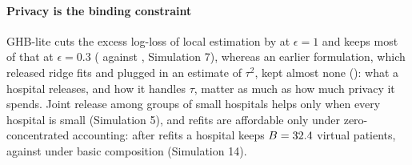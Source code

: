 \begin{table}[t]
\caption{Simulation 15: who pays. Left: the largest ratio of any hospital's mean excess log-loss to its own local value (above 1, some hospital is worse off than alone; lowest in bold). Middle: the percentage of hospitals that gain over local estimation. Right: the mean excess log-loss of the eight largest hospitals ($10^{-3}$ nats).}
\label{tab:sim15worst}
\scriptsize
\setlength{\tabcolsep}{2.4pt}
\end{table}

\paragraph{Privacy is the binding constraint} GHB-lite cuts the excess log-loss of local estimation by \SimSevenReduction{} at $\epsilon=1$ and keeps most of that at $\epsilon=0.3$ (\SimSevenGHBTenth{} against \SimSevenLocalTenth, Simulation 7), whereas an earlier formulation, which released ridge fits and plugged in an estimate of $\tau^2$, kept almost none (\SimFifteenStrictOld): what a hospital releases, and how it handles $\tau$, matter as much as how much privacy it spends. Joint release among groups of small hospitals helps only when every hospital is small (Simulation 5), and refits are affordable only under zero-concentrated accounting: after \SimFourteenR{} refits a hospital keeps $B=32.4$ virtual patients, against \SimFourteenBasic{} under basic composition (Simulation 14).

